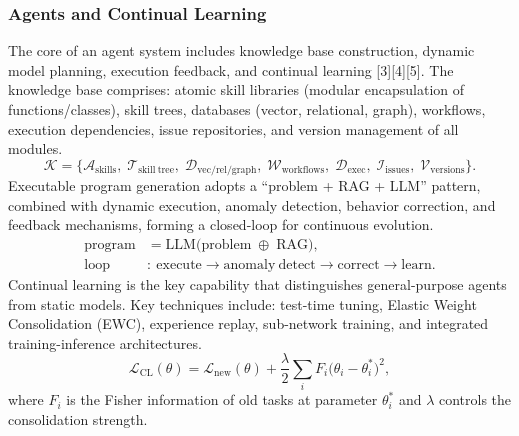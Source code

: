 \documentclass[12pt,a4paper]{article}
\begin{document}
\subsubsection{Agents and Continual Learning}
The core of an agent system includes knowledge base construction, dynamic model planning, execution feedback, and continual learning [3][4][5]. The knowledge base comprises: atomic skill libraries (modular encapsulation of functions/classes), skill trees, databases (vector, relational, graph), workflows, execution dependencies, issue repositories, and version management of all modules.
\begin{equation}
\mathcal{K}=\bigl\{\mathcal{A}_{\mathrm{skills}},\;\mathcal{T}_{\mathrm{skill\ tree}},\;\mathcal{D}_{\mathrm{vec/rel/graph}},\;\mathcal{W}_{\mathrm{workflows}},\;\mathcal{D}_{\mathrm{exec}},\;\mathcal{I}_{\mathrm{issues}},\;\mathcal{V}_{\mathrm{versions}}\bigr\}.
\label{eq:knowledge-base}
\end{equation}
Executable program generation adopts a ``problem + RAG + LLM'' pattern, combined with dynamic execution, anomaly detection, behavior correction, and feedback mechanisms, forming a closed-loop for continuous evolution.
\begin{equation}
\begin{split}
\mathrm{program}&=\mathrm{LLM}\bigl(\mathrm{problem}\;\oplus\;\mathrm{RAG}\bigr),\\
\mathrm{loop}&:\ \mathrm{execute}\to\mathrm{anomaly\ detect}\to\mathrm{correct}\to\mathrm{learn}.
\end{split}
\label{eq:agent-program-loop}
\end{equation}
Continual learning is the key capability that distinguishes general-purpose agents from static models. Key techniques include: test-time tuning, Elastic Weight Consolidation (EWC), experience replay, sub-network training, and integrated training-inference architectures.
\begin{equation}
\mathcal{L}_{\mathrm{CL}}(\theta)=\mathcal{L}_{\mathrm{new}}(\theta)+\frac{\lambda}{2}\sum_{i}F_{i}\bigl(\theta_i-\theta_i^{*}\bigr)^{2},
\label{eq:ewc}
\end{equation}
where $F_i$ is the Fisher information of old tasks at parameter $\theta_i^{*}$ and $\lambda$ controls the consolidation strength.
\end{document}
